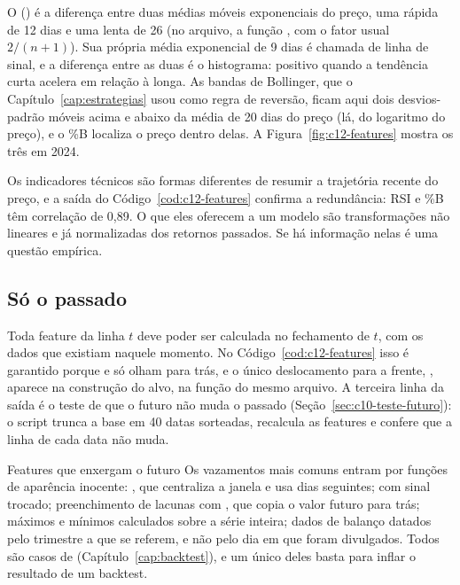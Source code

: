 O  () é a diferença entre duas médias móveis exponenciais do preço, uma rápida de 12 dias e uma lenta de 26 (no arquivo, a função , com o fator usual $2/(n+1)$). Sua própria média exponencial de 9 dias é chamada de linha de sinal, e a diferença entre as duas é o histograma: positivo quando a tendência curta acelera em relação à longa. As bandas de Bollinger, que o Capítulo~\ref{cap:estrategias} usou como regra de reversão, ficam aqui dois desvios-padrão móveis acima e abaixo da média de 20 dias do preço (lá, do logaritmo do preço), e o \%B localiza o preço dentro delas. A Figura~\ref{fig:c12-features} mostra os três em 2024.


Os indicadores técnicos são formas diferentes de resumir a trajetória recente do preço, e a saída do Código~\ref{cod:c12-features} confirma a redundância: RSI e \%B têm correlação de 0,89. O que eles oferecem a um modelo são transformações não lineares e já normalizadas dos retornos passados. Se há informação nelas é uma questão empírica.

\subsection{Só o passado}

Toda feature da linha $t$ deve poder ser calculada no fechamento de $t$, com os dados que existiam naquele momento. No Código~\ref{cod:c12-features} isso é garantido porque  e  só olham para trás, e o único deslocamento para a frente, , aparece na construção do alvo, na função  do mesmo arquivo. A terceira linha da saída é o teste de que o futuro não muda o passado (Seção~\ref{sec:c10-teste-futuro}): o script trunca a base em 40 datas sorteadas, recalcula as features e confere que a linha de cada data não muda.

\begin{armadilha}{Features que enxergam o futuro}
Os vazamentos mais comuns entram por funções de aparência inocente: , que centraliza a janela e usa dias seguintes;  com sinal trocado; preenchimento de lacunas com , que copia o valor futuro para trás; máximos e mínimos calculados sobre a série inteira; dados de balanço datados pelo trimestre a que se referem, e não pelo dia em que foram divulgados. Todos são casos de  (Capítulo~\ref{cap:backtest}), e um único deles basta para inflar o resultado de um backtest.
\end{armadilha}

